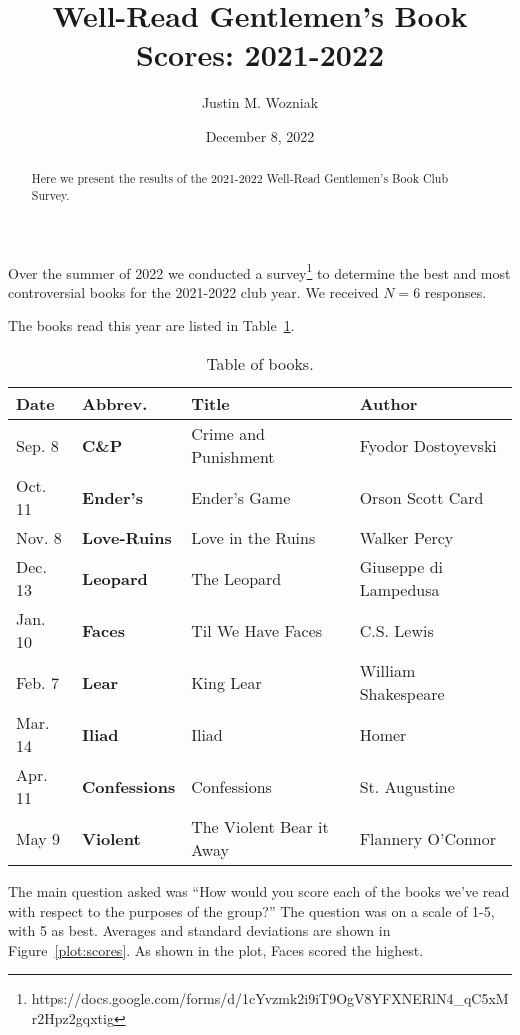 \documentclass{article}
\newcommand{\B}[1]{\textbf{#1}}
\newcommand{\PLOT}[1]{Figure~\ref{plot:#1}}
\newcommand{\TABLE}[1]{Table~\ref{table:#1}}
\begin{document}
\title{Well-Read Gentlemen's Book Scores: 2021-2022}
\author{Justin M. Wozniak}
\date{December 8, 2022}

\maketitle

\begin{abstract}
\noindent Here we present the results of the 2021-2022 Well-Read Gentlemen's Book Club Survey.
\end{abstract}

\noindent Over the summer of 2022 we conducted a survey\footnote{
{\sffamily https://docs.google.com/forms/d/1cYvzmk2i9iT9OgV8YFXNERlN4\_qC5xMr2Hpz2gqxtig}} to determine the best and most controversial books for the 2021-2022 club year.
We received $N=6$ responses.

The books read this year are listed in \TABLE{books}.

\begin{table}
  \begin{tabular}{llll}
    \B{Date} & \B{Abbrev.} & \B{Title} & \B{Author} \\ \hline \hline
    Sep.  8  & \B{C\&P} & Crime and Punishment & Fyodor Dostoyevski \\
    Oct. 11  & \B{Ender's} &  Ender's Game & Orson Scott Card \\
    Nov.  8  & \B{Love-Ruins} & Love in the Ruins & Walker Percy \\
    Dec. 13  & \B{Leopard} & The Leopard & Giuseppe di Lampedusa \\
    Jan. 10  & \B{Faces} & Til We Have Faces & C.S. Lewis \\
    Feb.  7  & \B{Lear} & King Lear & William Shakespeare \\
    Mar. 14  & \B{Iliad} & Iliad & Homer \\
    Apr. 11  & \B{Confessions} & Confessions & St. Augustine \\
    May   9  & \B{Violent} & The Violent Bear it Away & Flannery O'Connor \\
  \end{tabular}
  \caption{Table of books. \label{table:books}}
\end{table}

The main question asked was ``How would you score each of the books we've read with respect to the purposes of the group?''  The question was on a scale of 1-5, with 5 as best.  Averages and standard deviations are shown in \PLOT{scores}.  As shown in the plot, Faces scored the highest.
\end{document}
